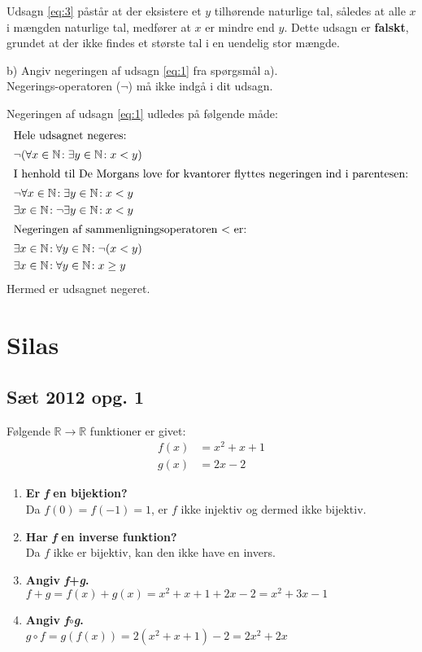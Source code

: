 \documentclass[12pt, a4paper]{article}
\begin{document}
Udsagn \eqref{eq:3} påstår at der eksistere et \(y\) tilhørende naturlige tal, således at alle \(x\) i mængden naturlige tal, medfører at \(x\) er mindre end \(y\). Dette udsagn er \textbf{falskt}, grundet at der ikke findes et største tal i en uendelig stor mængde.
\begin{tcolorbox}
b) Angiv negeringen af udsagn \eqref{eq:1} fra spørgsmål a).\\ Negerings-operatoren (\(\neg\)) må ikke indgå i dit udsagn.
\end{tcolorbox}\vspace{-5pt}
Negeringen af udsagn \eqref{eq:1} udledes på følgende måde:\vspace{-5pt}
\begin{align}
\intertext{Hele udsagnet negeres:}
	&\neg(\forall x \in \mathbb{N}\! : \exists y \in \mathbb{N}\! : x < y)\\
\intertext{I henhold til De Morgans love for kvantorer flyttes negeringen ind i parentesen:}
	&\neg\forall x \in \mathbb{N}\! : \exists y \in \mathbb{N}\! : x < y\\
	&\exists x \in \mathbb{N}\! : \neg\exists y \in \mathbb{N}\! : x < y\\
\intertext{Negeringen af sammenligningsoperatoren $<$ er:}
	&\exists x \in \mathbb{N}\! : \forall y \in \mathbb{N}\! : \neg(x < y)\\
	&\exists x \in \mathbb{N}\! : \forall y \in \mathbb{N}\! : x \geq y
\end{align}
Hermed er udsagnet negeret.
\newpage

\section{Silas}
\subsection{Sæt 2012 opg. 1}
Følgende $\mathbb{R} \rightarrow \mathbb{R}$ funktioner er givet:
\begin{align*}
	f(x) & = x^2+x+1 \\
	g(x) & = 2x -2
\end{align*}
\begin{enumerate}[label=\alph*)]
	\item {
		\textbf{Er \textit{f} en bijektion?} \\
		Da $f(0)=f(-1)=1$, er $f$ ikke injektiv og dermed ikke bijektiv.
	}
	\item {
		\textbf{Har \textit{f} en inverse funktion?} \\
		Da $f$ ikke er bijektiv, kan den ikke have en invers.
	}
	\item {
		\textbf{Angiv \textit{f}+\textit{g}.} \\
		$f+g=f(x)+g(x)=x^2+x+1+2x-2=x^2+3x-1$
	}
	\item {
		\textbf{Angiv \textit{f}$\circ$\textit{g}.} \\
		$g\circ f=g(f(x))=2(x^2+x+1)-2=2x^2+2x$
	}
\end{enumerate}
\end{document}
